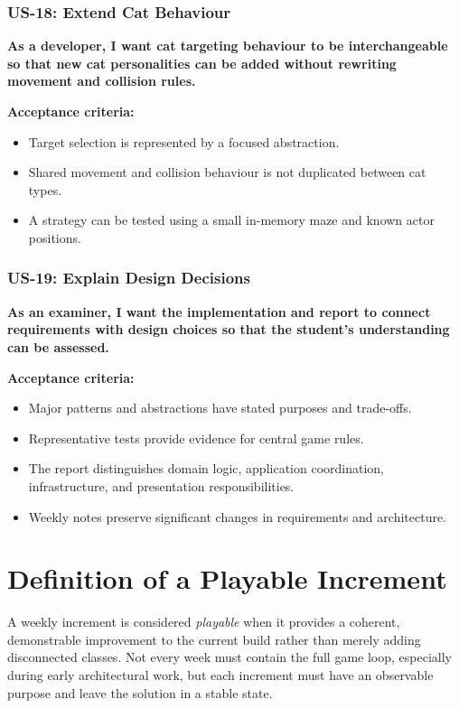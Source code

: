 \subsubsection{US-18: Extend Cat Behaviour}

\textbf{As a developer, I want cat targeting behaviour to be interchangeable so that new cat personalities can be added without rewriting movement and collision rules.}

\textbf{Acceptance criteria:}
\begin{itemize}
	\item Target selection is represented by a focused abstraction.
	\item Shared movement and collision behaviour is not duplicated between cat types.
	\item A strategy can be tested using a small in-memory maze and known actor positions.
\end{itemize}

\subsubsection{US-19: Explain Design Decisions}

\textbf{As an examiner, I want the implementation and report to connect requirements with design choices so that the student's understanding can be assessed.}

\textbf{Acceptance criteria:}
\begin{itemize}
	\item Major patterns and abstractions have stated purposes and trade-offs.
	\item Representative tests provide evidence for central game rules.
	\item The report distinguishes domain logic, application coordination, infrastructure, and presentation responsibilities.
	\item Weekly notes preserve significant changes in requirements and architecture.
\end{itemize}

\section{Definition of a Playable Increment}
\label{sec:playable-increment}

A weekly increment is considered \emph{playable} when it provides a coherent, demonstrable improvement to the current build rather than merely adding disconnected classes. Not every week must contain the full game loop, especially during early architectural work, but each increment must have an observable purpose and leave the solution in a stable state.

